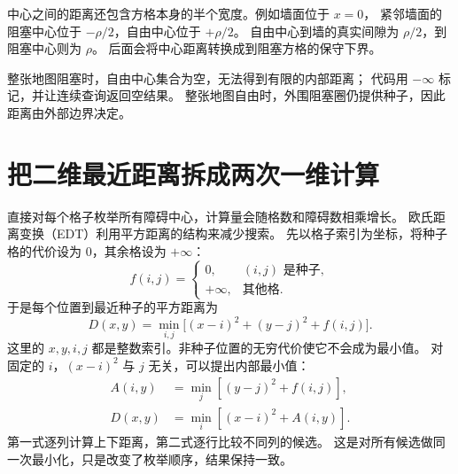 中心之间的距离还包含方格本身的半个宽度。例如墙面位于 $x=0$，
紧邻墙面的阻塞中心位于 $-\rho/2$，自由中心位于 $+\rho/2$。
自由中心到墙的真实间隙为 $\rho/2$，到阻塞中心则为 $\rho$。
后面会将中心距离转换成到阻塞方格的保守下界。

\begin{center}
\end{center}
整张地图阻塞时，自由中心集合为空，无法得到有限的内部距离；
代码用 $-\infty$ 标记，并让连续查询返回空结果。
整张地图自由时，外围阻塞圈仍提供种子，因此距离由外部边界决定。

\section{把二维最近距离拆成两次一维计算}
直接对每个格子枚举所有障碍中心，计算量会随格数和障碍数相乘增长。
欧氏距离变换（EDT）利用平方距离的结构来减少搜索。
先以格子索引为坐标，将种子格的代价设为 0，其余格设为 $+\infty$：
\begin{equation}
f(i,j)=\begin{cases}0,&(i,j)\text{ 是种子},\\+\infty,&\text{其他格}.
\end{cases}
\end{equation}
于是每个位置到最近种子的平方距离为
\begin{equation}
D(x,y)=\min_{i,j}\big[(x-i)^2+(y-j)^2+f(i,j)\big].
\end{equation}
这里的 $x,y,i,j$ 都是整数索引。非种子位置的无穷代价使它不会成为最小值。
对固定的 $i$，$(x-i)^2$ 与 $j$ 无关，可以提出内部最小值：
\begin{align}
A(i,y)&=\min_j[(y-j)^2+f(i,j)],\\
D(x,y)&=\min_i[(x-i)^2+A(i,y)].
\end{align}
第一式逐列计算上下距离，第二式逐行比较不同列的候选。
这是对所有候选做同一次最小化，只是改变了枚举顺序，结果保持一致。

